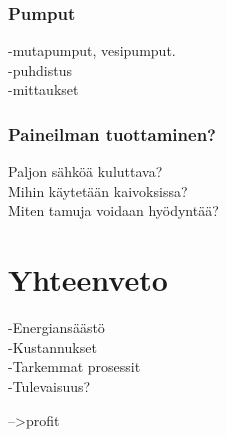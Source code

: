 \documentclass[finnish,12pt,a4paper,pdftex,elec,utf8]{aaltothesis}
\begin{document}
\subsubsection{Pumput}
-mutapumput, vesipumput.\\
-puhdistus\\
-mittaukset

\subsubsection{Paineilman tuottaminen?}
Paljon sähköä kuluttava?\\
Mihin käytetään kaivoksissa?\\
Miten tamuja voidaan hyödyntää?

\clearpage

\section{Yhteenveto}
-Energiansäästö\\
-Kustannukset\\
-Tarkemmat prosessit\\
-Tulevaisuus?

-->profit


\clearpage
\end{document}
